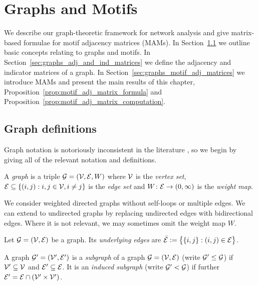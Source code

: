 \chapter{Graphs and Motifs} \label{chap:graphs}

We describe our graph-theoretic framework for network analysis and give matrix-based formulae for motif adjacency matrices (MAMs).
In Section~\ref{sec:graphs_graph_definitions} we outline basic concepts relating to graphs and motifs.
In Section~\ref{sec:graphs_adj_and_ind_matrices} we define the adjacency and indicator matrices of a graph.
In Section~\ref{sec:graphs_motif_adj_matrices} we introduce MAMs and present the main results of this chapter, Proposition~\ref{prop:motif_adj_matrix_formula} and Proposition~\ref{prop:motif_adj_matrix_computation}.








\section{Graph definitions} \label{sec:graphs_graph_definitions}

Graph notation is notoriously inconsistent in the literature \cite{intro_to_graph_theory}, so we begin by giving all of the relevant notation and definitions.

\begin{definition}[Graphs]
A \emph{graph} is a triple $\mathcal{G} = (\mathcal{V,E},W)$ where $\mathcal{V}$ is the \emph{vertex set}, $\mathcal{E} \subseteq \left\{ (i,j) : i,j \in \mathcal{V}, i \neq j \right\}$ is the \emph{edge set} and $W\colon \mathcal{E} \to (0,\infty)$ is the \emph{weight map}.
\end{definition}

\begin{remark}
We consider weighted directed graphs without self-loops or multiple edges. We can extend to undirected graphs by replacing undirected edges with bidirectional edges. Where it is not relevant, we may sometimes omit the weight map $W$.
\end{remark}

\begin{definition}
Let $\mathcal{G} = (\mathcal{V,E})$ be a graph. Its \emph{underlying edges} are $\bar{\mathcal{E}} \vcentcolon = \big\{ \{i,j\} : (i,j) \in \mathcal{E} \big\}$.
\end{definition}

\begin{definition}[Subgraphs]
A graph $\mathcal{G'} = (\mathcal{V',E'})$ is a \emph{subgraph} of a graph $\mathcal{G} = (\mathcal{V,E})$ (write $\mathcal{G'} \leq \mathcal{G}$) if $\mathcal{V'} \subseteq \mathcal{V}$ and $\mathcal{E'} \subseteq \mathcal{E}$. It is an \emph{induced subgraph} (write $\mathcal{G'} < \mathcal{G}$) if further $\mathcal{E'} = \mathcal{E} \cap ( \mathcal{V'} \times \mathcal{V'} )$.
\end{definition}

